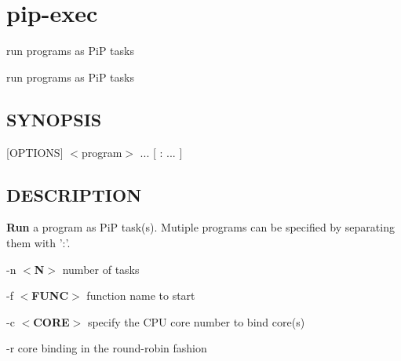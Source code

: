 \hypertarget{group__pip-exec}{\section{pip-\/exec}
\label{group__pip-exec}
}


run programs as Pi\-P tasks  


run programs as Pi\-P tasks \hypertarget{group__piplnlibs_synopsis}{}\subsection{S\-Y\-N\-O\-P\-S\-I\-S}\label{group__piplnlibs_synopsis}
{ }\mbox{[}O\-P\-T\-I\-O\-N\-S\mbox{]} $<$program$>$ ... \mbox{[} \-: ... \mbox{]}\hypertarget{group__piplnlibs_description}{}\subsection{D\-E\-S\-C\-R\-I\-P\-T\-I\-O\-N}\label{group__piplnlibs_description}
{\bfseries Run} a program as Pi\-P task(s). Mutiple programs can be specified by separating them with '\-:'.

-\/n {\bfseries $<$N$>$} number of tasks\par
-\/f {\bfseries $<$F\-U\-N\-C$>$} function name to start\par
-\/c {\bfseries $<$C\-O\-R\-E$>$} specify the C\-P\-U core number to bind core(s)\par
-\/r core binding in the round-\/robin fashion\par
